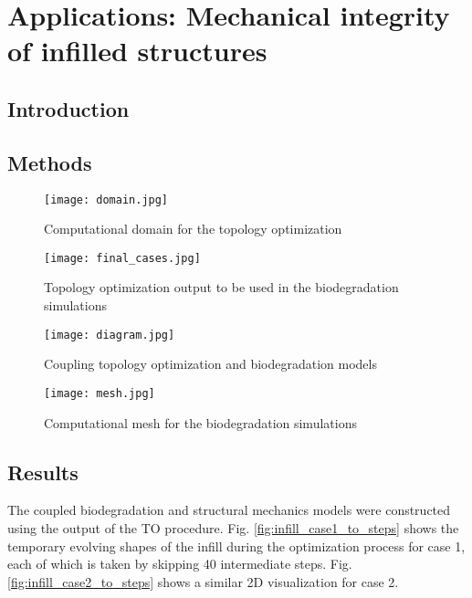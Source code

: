 \chapter{Applications: Mechanical integrity of infilled structures}\label{ch:infill}

\section{Introduction}

\section{Methods}

\begin{figure}[h]
\centering
\medskip
\texttt{[image: domain.jpg]}
\caption[Computational domain for the topology optimization]{Computational domain for the topology optimization} \label{fig:infill_domain}
\end{figure}


\begin{figure}[h]
\centering
\medskip
\texttt{[image: final\_cases.jpg]}
\caption[Topology optimization output to be used in the biodegradation simulations]{Topology optimization output to be used in the biodegradation simulations} \label{fig:infill_final_cases}
\end{figure}


\begin{figure}[h]
\centering
\medskip
\texttt{[image: diagram.jpg]}
\caption[Coupling topology optimization and biodegradation models]{Coupling topology optimization and biodegradation models} \label{fig:infill_diagram}
\end{figure}


\begin{figure}[h]
\centering
\medskip
\texttt{[image: mesh.jpg]}
\caption[Computational mesh for the biodegradation simulations]{Computational mesh for the biodegradation simulations} \label{fig:infill_mesh}
\end{figure}



\section{Results}

The coupled biodegradation and structural mechanics models were constructed using the output of the TO procedure. Fig. \ref{fig:infill_case1_to_steps} shows the temporary evolving shapes of the infill during the optimization process for case 1, each of which is taken by skipping 40 intermediate steps. Fig. \ref{fig:infill_case2_to_steps} shows a similar 2D visualization for case 2.


